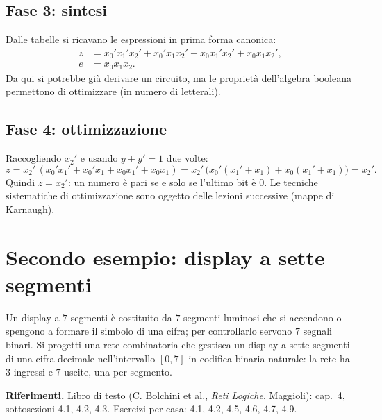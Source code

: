 \documentclass[11pt,a4paper]{article}
\begin{document}
\subsection*{Fase 3: sintesi}

Dalle tabelle si ricavano le espressioni in prima forma canonica:
\begin{align*}
z &= x_0'x_1'x_2' + x_0'x_1x_2' + x_0x_1'x_2' + x_0x_1x_2', \\
e &= x_0x_1x_2.
\end{align*}
Da qui si potrebbe già derivare un circuito, ma le proprietà dell'algebra booleana permettono di ottimizzare (in numero di letterali).

\subsection*{Fase 4: ottimizzazione}

Raccogliendo $x_2'$ e usando $y + y' = 1$ due volte:
\[
z = x_2'\,(x_0'x_1' + x_0'x_1 + x_0x_1' + x_0x_1) = x_2'\,\bigl(x_0'(x_1'+x_1) + x_0(x_1'+x_1)\bigr) = x_2'.
\]
Quindi $z = x_2'$: un numero è pari se e solo se l'ultimo bit è $0$. Le tecniche sistematiche di ottimizzazione sono oggetto delle lezioni successive (mappe di Karnaugh).

\section{Secondo esempio: display a sette segmenti}

Un display a $7$ segmenti è costituito da $7$ segmenti luminosi che si accendono o spengono a formare il simbolo di una cifra; per controllarlo servono $7$ segnali binari. Si progetti una rete combinatoria che gestisca un display a sette segmenti di una cifra decimale nell'intervallo $[0, 7]$ in codifica binaria naturale: la rete ha $3$ ingressi e $7$ uscite, una per segmento.

\medskip
\noindent\textbf{Riferimenti.} Libro di testo (C. Bolchini et al., \emph{Reti Logiche}, Maggioli): cap.\ 4, sottosezioni 4.1, 4.2, 4.3. Esercizi per casa: 4.1, 4.2, 4.5, 4.6, 4.7, 4.9.
\end{document}
